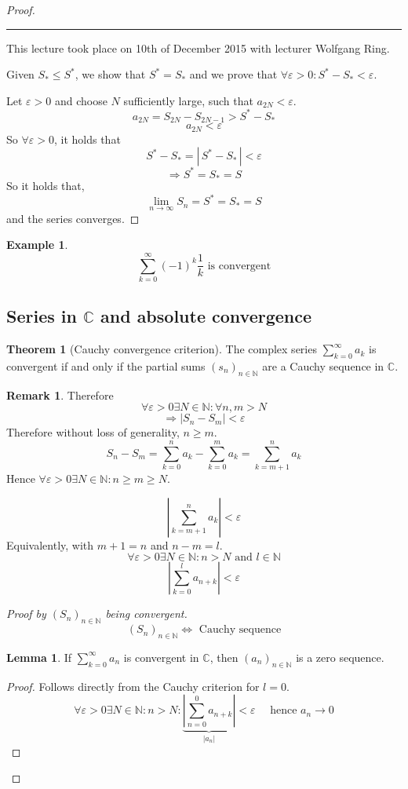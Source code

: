 \documentclass[a4paper,landscape,twocolumn]{article}
\theoremstyle{definition}
\newtheorem{theorem}{Theorem}
\newtheorem{rem}{Remark}
\newtheorem{ex}{Example}
\newtheorem{lemma}{Lemma}
\newcommand\abs[1]{\left|#1\right|}
\newcommand\seq[1]{{\left(#1\right)}_{n \in \mathbb N}}
\newcommand\card[1]{\left|\,#1\,\right|}
\newcommand\meta[3]{\hrule{} This #1 took place on #2 with lecturer #3.\par}
\begin{document}
\begin{proof}
  \meta{lecture}{10th of December 2015}{Wolfgang Ring}

  Given $S_* \leq S^*$, we show that $S^* = S_*$ and we prove that $\forall \varepsilon > 0: S^* - S_* < \varepsilon$.

  Let $\varepsilon > 0$ and choose $N$ sufficiently large, such that $a_{2N} < \varepsilon$.
  \[ a_{2N} = S_{2N} - S_{2N-1} > S^* - S_* \]
  \[ a_{2N} < \varepsilon \]
  So $\forall \varepsilon > 0$, it holds that
  \[ S^* - S_* = \card{S^* - S_*} < \varepsilon \]
  \[ \Rightarrow S^* = S_* = S \]
  So it holds that,
  \[ \lim_{n\to\infty} S_n = S^* = S_* = S \]
  and the series converges.
\end{proof}

\begin{ex}
  \[ \sum_{k=0}^\infty (-1)^{k} \frac{1}{k} \text{ is convergent} \]
\end{ex}

\subsection{Series in $\mathbb C$ and absolute convergence}
%
\begin{theorem}[Cauchy convergence criterion]
  The complex series $\sum_{k=0}^{\infty} a_k$ is convergent if and only if
  the partial sums $\seq{s_n}$ are a Cauchy sequence in $\mathbb C$.
\end{theorem}
\begin{rem}
  Therefore
  \[ \forall \varepsilon > 0 \exists N \in \mathbb N: \forall n,m > N \]
  \[ \Rightarrow \abs{S_n - S_m} < \varepsilon \]
  Therefore without loss of generality, $n \geq m$.
  \[ S_n - S_m = \sum_{k=0}^n a_k - \sum_{k=0}^m a_k = \sum_{k=m+1}^n a_k \]
  Hence $\forall \varepsilon > 0 \exists N \in \mathbb N: n \geq m \geq N$.

  \[ \abs{\sum_{k=m+1}^n a_k} < \varepsilon \]
  Equivalently, with $m + 1 = n$ and $n - m = l$.
  \[ \forall \varepsilon > 0 \exists N \in \mathbb N: n > N \text{ and } l \in \mathbb N \]
  \[ \abs{\sum_{k=0}^l a_{n+k}} < \varepsilon \]
\end{rem}
\begin{proof}[Proof by $\seq{S_n}$ being convergent]
  \[ \seq{S_n} \Leftrightarrow \text{ Cauchy sequence} \]

  \begin{lemma}
    If $\sum_{k=0}^{\infty} a_n$ is convergent in $\mathbb C$, then $\seq{a_n}$ is a zero sequence.
  \end{lemma}
  \begin{proof}
    Follows directly from the Cauchy criterion for $l = 0$.
    \[
      \forall \varepsilon > 0 \exists N \in \mathbb N: n > N:
      \underbrace{\abs{\sum_{n=0}^0 a_{n+k}}}_{\abs{a_n}} < \varepsilon
      \quad \text{ hence } a_n \to 0
    \]
  \end{proof}
\end{proof}
\end{document}
